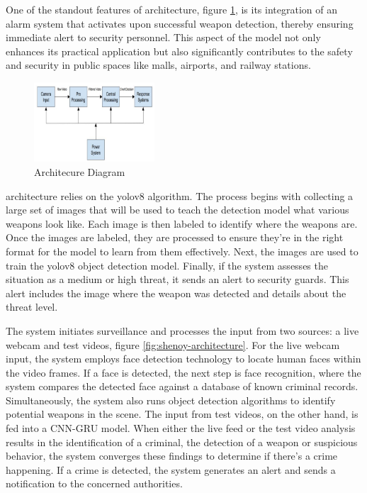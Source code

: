 \newpage
One of the standout features of \citet{rfc6} architecture, figure \ref{fig:gawade-architecture}, is its integration of an alarm system that activates upon successful weapon detection, thereby ensuring immediate alert to security personnel. This aspect of the model not only enhances its practical application but also significantly contributes to the safety and security in public spaces like malls, airports, and railway stations.
\begin{figure}[h]
    \centering 
    \includegraphics[width=0.4\textwidth]{figs/Gawade-architecture.png} 
    \caption{\citet{rfc6} Architecure Diagram}
    \label{fig:gawade-architecture}
\end{figure}

\citet{rfc17} architecture relies on the \ac{yolo}v8 algorithm. The process begins with collecting a large set of images that will be used to teach the detection model what various weapons look like. Each image is then labeled to identify where the weapons are. Once the images are labeled, they are processed to ensure they're in the right format for the model to learn from them effectively. Next, the images are used to train the \ac{yolo}v8 object detection model. Finally, if the system assesses the situation as a medium or high threat, it sends an alert to security guards. This alert includes the image where the weapon was detected and details about the threat level.

The \citet{rfc7} system initiates surveillance and processes the input from two sources: a live webcam and test videos, figure \ref{fig:shenoy-architecture}. For the live webcam input, the system employs face detection technology to locate human faces within the video frames. If a face is detected, the next step is face recognition, where the system compares the detected face against a database of known criminal records. Simultaneously, the system also runs object detection algorithms to identify potential weapons in the scene. The input from test videos, on the other hand, is fed into a CNN-GRU model. When either the live feed or the test video analysis results in the identification of a criminal, the detection of a weapon or suspicious behavior, the system converges these findings to determine if there's a crime happening. If a crime is detected, the system generates an alert and sends a notification to the concerned authorities.

